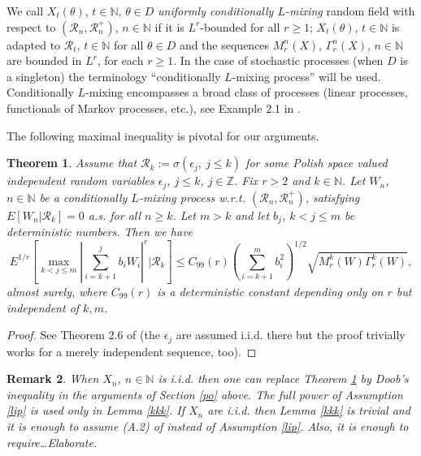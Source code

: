 \documentclass[a4paper,draft]{article}
\newtheorem{theorem}{Theorem}[section]
\newtheorem{remark}[theorem]{Remark}
\begin{document}
We call $X_t(\theta)$, $t\in\mathbb{N}$, $\theta\in D$
\emph{uniformly {conditionally} $L$-mixing} random field
with respect to $(\mathcal{R}_n,\mathcal{R}_n^+)$, $n\in\mathbb{N}$ if
it is $L^r$-bounded for all $r\geq 1$; $X_t(\theta)$, $t\in\mathbb{N}$ is adapted to
$\mathcal{R}_t$, $t\in\mathbb{N}$
for all $\theta\in D$
and the sequences  $M^n_r(X)$, $\Gamma^n_r(X)$, $n\in\mathbb{N}$
are bounded in $L^r$, for each $r\geq 1$. In the case of stochastic processes
(when $D$ is a singleton)
the terminology ``conditionally $L$-mixing process'' will be used.
Conditionally $L$-mixing encompasses a broad class of processes (linear processes,
functionals of Markov processes, etc.), see Example 2.1 in \cite{convex}.

The following maximal inequality
is pivotal for our arguments.

\begin{theorem}\label{estim} Assume that
$\mathcal{R}_k:=\sigma(\epsilon_j,\
j\leq k)$ for some Polish space valued independent random variables $\epsilon_j$, $j\leq k$, $j\in\mathbb{Z}$.
Fix $r>2$ and $k\in\mathbb{N}$.
Let $W_n$, $n\in\mathbb{N}$ be a conditionally $L$-mixing process
w.r.t. $(\mathcal{R}_n,\mathcal{R}_n^+)$, satisfying
$E[W_n\vert\mathcal{R}_k]=0$ a.s. for all {$n\geq k$}.
Let $m >k$ and let $b_j$, $k< j\leq m$ be deterministic numbers. Then we have
\begin{equation}\label{mandrill}
E^{1/r}\left[ \max_{k < j \le m} \left| \sum_{i = k+1}^{j} b_i W_i \right|^r \big\vert\mathcal{R}_k \right]
 \le C_{99}(r)\left( \sum_{i=k+1}^{m} b_i^2 \right)^{1/2} \sqrt{{M}_r^{k}(W) \Gamma_r^{k}(W)},
\end{equation}
almost surely, where $C_{99}(r)$ is a deterministic constant depending only on $r$ but independent of $k,m$.
\end{theorem}
\begin{proof} See Theorem 2.6 of \cite{4} (the $\epsilon_j$ are assumed i.i.d. there but the proof
trivially works for a merely independent sequence, too).
\end{proof}

\begin{remark}\label{padi2} {\rm When $X_n$,
$n\in\mathbb{N}$ is i.i.d. then one can replace Theorem \ref{estim} by Doob's inequality in
the arguments of Section \ref{po} above. The full power of Assumption \ref{lip} is
used only in Lemma \ref{kkk}. If $X_n$ are i.i.d. then Lemma \ref{kkk} is trivial
and it is enough to assume (A.2) of \cite{raginsky} instead of Assumption \ref{lip}. Also, it is enough to require\ldots Elaborate.}
\end{remark}
\end{document}
